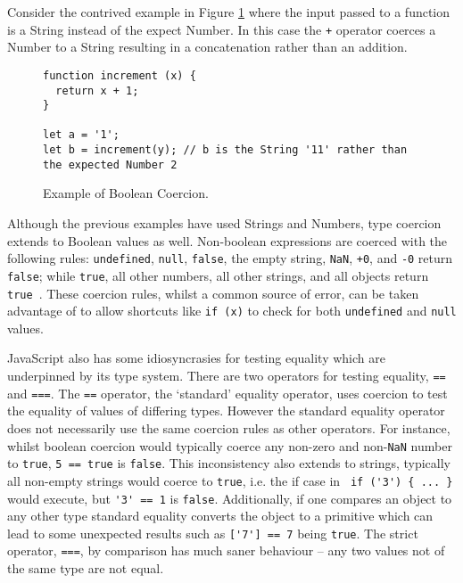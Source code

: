 \documentclass[]{final_report}
\begin{document}
Consider the contrived example in Figure \ref{fig:js-increment-concat} where the input passed to a function is a String instead of the expect Number. In this case the \lstinline|+| operator coerces a Number to a String resulting in a concatenation rather than an addition.

\begin{figure}[t]
\begin{lstlisting}
function increment (x) {
  return x + 1;
}

let a = '1';
let b = increment(y); // b is the String '11' rather than the expected Number 2
\end{lstlisting}
\caption{\label{fig:js-increment-concat} Example of Boolean Coercion.}
\end{figure} 

Although the previous examples have used Strings and Numbers, type coercion extends to Boolean values as well. Non-boolean expressions are coerced with the following rules: \lstinline|undefined|, \lstinline|null|, \lstinline|false|, the empty string, \lstinline|NaN|, \lstinline|+0|, and \lstinline|-0| return \lstinline|false|; while \lstinline|true|, all other numbers, all other strings, and all objects return \lstinline|true|~\cite{EcmaScript}. These coercion rules, whilst a common source of error, can be taken advantage of to allow shortcuts like \lstinline|if (x)| to check for both \lstinline|undefined| and \lstinline|null| values.

JavaScript also has some idiosyncrasies for testing equality which are underpinned by its type system. There are two operators for testing equality, \lstinline|==| and \lstinline|===|. The \lstinline|==| operator, the `standard' equality operator, uses coercion to test the equality of values of differing types. However the standard equality operator does not necessarily use the same coercion rules as other operators. For instance, whilst boolean coercion would typically coerce any non-zero and non-\lstinline|NaN| number to \lstinline|true|, \lstinline|5 == true| is \lstinline|false|. This inconsistency also extends to strings, typically all non-empty strings would coerce to \lstinline|true|, i.e. the if case in \lstinline| if ('3') { ... }| would execute, but \lstinline|'3' == 1| is \lstinline|false|. Additionally, if one compares an object to any other type standard equality converts the object to a primitive which can lead to some unexpected results such as \lstinline|['7'] == 7| being \lstinline|true|. The strict operator, \lstinline|===|, by comparison has much saner behaviour -- any two values not of the same type are not equal.
\end{document}

